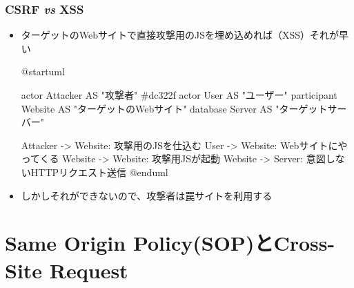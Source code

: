\begin{frame}[fragile]
  \frametitle{CSRF \textit{vs} XSS}
  
  \begin{itemize}
    \item ターゲットのWebサイトで直接攻撃用のJSを埋め込めれば（XSS）それが早い

    \hfill{}
    \begin{center} 
      \begin{minipage}{.6\textwidth}
        \begin{plantuml}
          @startuml
       
          actor Attacker AS "攻撃者" #dc322f
          actor User AS "ユーザー"
          participant Website AS "ターゲットのWebサイト"
          database Server AS "ターゲットサーバー"
       
          Attacker -> Website: 攻撃用のJSを仕込む
          User -> Website: Webサイトにやってくる
          Website -> Website: 攻撃用JSが起動
          Website -> Server: 意図しないHTTPリクエスト送信
          @enduml
        \end{plantuml}
      \end{minipage}
    \end{center}
    \hfill{}
    
    \pause
    \item しかしそれができないので、攻撃者は罠サイトを利用する
  \end{itemize}
\end{frame}

\section{Same Origin Policy(SOP)とCross-Site Request}

